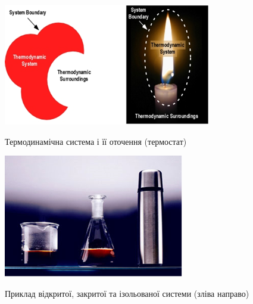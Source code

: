 \begin{figure}[h!]\centering
    \begin{subcaptionblock}{0.45\linewidth}\centering
        \includegraphics[width=\linewidth]{Lec1/ThermodSysA}
        \caption{Термодинамічна система і її оточення (термостат)}\label{pic:ThermodSysA}
    \end{subcaptionblock}
\quad%
    \begin{subcaptionblock}{0.45\linewidth}\centering
        \includegraphics[width=\linewidth]{Lec1/ThermodSysB}
        \caption{Приклад відкритої, закритої та ізольованої системи (зліва направо)}\label{pic:ThermodSysB}
    \end{subcaptionblock}
\caption{}
\end{figure}

